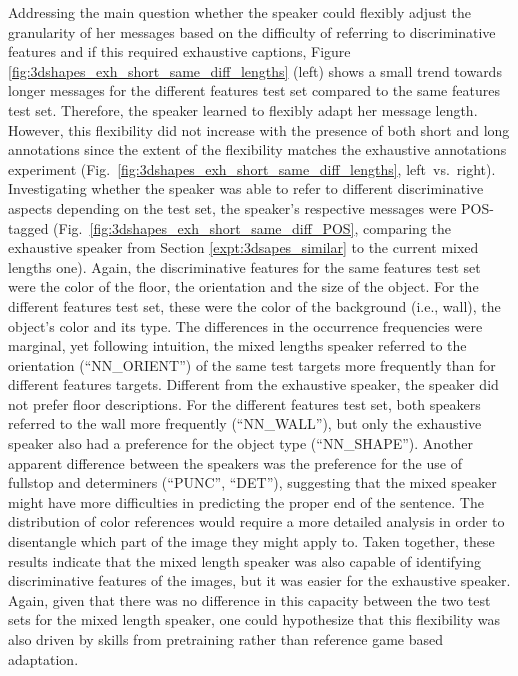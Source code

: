 Addressing the main question whether the speaker could flexibly adjust the granularity of her messages based on the difficulty of referring to discriminative features and if this required exhaustive captions, Figure \ref{fig:3dshapes_exh_short_same_diff_lengths} (left) shows a small trend towards longer messages for the different features test set compared to the same features test set. Therefore, the speaker learned to flexibly adapt her message length. However, this flexibility did not increase with the presence of both short and long annotations since the extent of the flexibility matches the exhaustive annotations experiment (Fig.~\ref{fig:3dshapes_exh_short_same_diff_lengths}, left~vs.~right). 
Investigating whether the speaker was able to refer to different discriminative aspects depending on the test set, the speaker's respective messages were POS-tagged (Fig.~\ref{fig:3dshapes_exh_short_same_diff_POS}, comparing the exhaustive speaker from Section \ref{expt:3dsapes_similar} to the current mixed lengths one). Again, the discriminative features for the same features test set were the color of the floor, the orientation and the size of the object. For the different features test set, these were the color of the background (i.e., wall), the object's color and its type. The differences in the occurrence frequencies were marginal, yet following intuition, %
the mixed lengths speaker referred to the orientation (``NN\_ORIENT'') of the same test targets more frequently than for different features targets. Different from the exhaustive speaker, the speaker did not prefer floor descriptions. 
For the different features test set, both speakers referred to the wall more frequently (``NN\_WALL''), but only the exhaustive speaker also had a preference for the object type (``NN\_SHAPE''). Another apparent difference between the speakers was the preference for the use of fullstop and determiners (``PUNC'', ``DET''), suggesting that the mixed speaker might have more difficulties in predicting the proper end of the sentence.
The distribution of color references would require a more detailed analysis in order to disentangle which part of the image they might apply to. Taken together, these results indicate that the mixed length speaker was also capable of identifying discriminative features of the images, but it was easier for the exhaustive speaker. Again, given that there was no difference in this capacity between the two test sets for the mixed length speaker, one could hypothesize that this flexibility was also driven by skills from pretraining rather than reference game based adaptation. 
